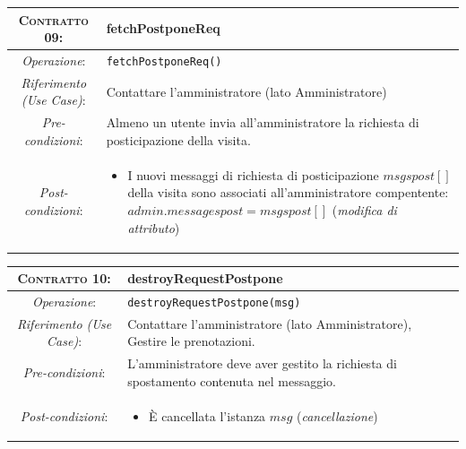 \begin{tabularx}{\columnwidth}{cX}
\toprule
\textsc{Contratto 09}: & 	\textbf{fetchPostponeReq}\\
\midrule
\textit{Operazione}: & 		\texttt{fetchPostponeReq()}\\
\textit{Riferimento (Use Case)}: &	Contattare l'amministratore (lato Amministratore)\\
\textit{Pre-condizioni}: &  	Almeno un utente invia all'amministratore la
				richiesta di posticipazione della visita.\\
\textit{Post-condizioni}: & 	\begin{itemize}
\item I nuovi messaggi di richiesta di posticipazione $msgspost[]$ della visita sono associati all'amministratore
	compentente: $admin.messagespost = msgspost[]$ (\textit{modifica di attributo})
\end{itemize}\\
\bottomrule
\end{tabularx}
\medskip

\begin{tabularx}{\columnwidth}{cX}
\toprule
\textsc{Contratto 10}: & 	\textbf{destroyRequestPostpone}\\
\midrule
\textit{Operazione}: & 		\texttt{destroyRequestPostpone(msg)}\\
\textit{Riferimento (Use Case)}: &	Contattare l'amministratore (lato Amministratore),
				Gestire le prenotazioni.\\
\textit{Pre-condizioni}: &  	L'amministratore deve aver gestito la richiesta di
				spostamento contenuta nel messaggio.\\
\textit{Post-condizioni}: & 	\begin{itemize}
\item È cancellata l'istanza $msg$ (\textit{cancellazione})
\end{itemize}\\
\bottomrule
\end{tabularx}
\medskip


